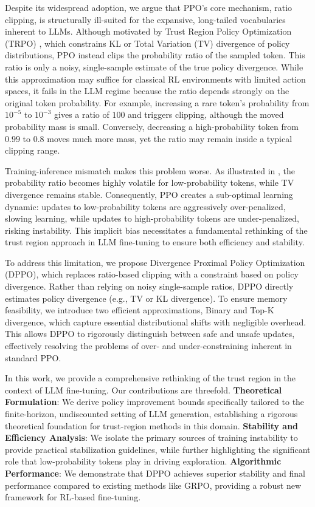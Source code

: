Despite its widespread adoption, we argue that PPO’s core mechanism, ratio clipping, is structurally ill-suited for the expansive, long-tailed vocabularies inherent to LLMs. Although motivated by Trust Region Policy Optimization (TRPO) \citep{schulman2015trust}, which constrains KL or Total Variation (TV) divergence of policy distributions, PPO instead clips the probability ratio of the sampled token. This ratio is only a noisy, single-sample estimate of the true policy divergence. While this approximation may suffice for classical RL environments with limited action spaces, it fails in the LLM regime because the ratio depends strongly on the original token probability. For example, increasing a rare token's probability from $10^{-5}$ to $10^{-3}$ gives a ratio of $100$ and triggers clipping, although the moved probability mass is small. Conversely, decreasing a high-probability token from $0.99$ to $0.8$ moves much more mass, yet the ratio may remain inside a typical clipping range.

Training-inference mismatch makes this problem worse. As illustrated in , the probability ratio becomes highly volatile for low-probability tokens, while TV divergence remains stable. Consequently, PPO creates a sub-optimal learning dynamic: updates to low-probability tokens are aggressively over-penalized, slowing learning, while updates to high-probability tokens are under-penalized, risking instability. This implicit bias necessitates a fundamental rethinking of the trust region approach in LLM fine-tuning to ensure both efficiency and stability.

To address this limitation, we propose Divergence Proximal Policy Optimization (DPPO), which replaces ratio-based clipping with a constraint based on policy divergence. Rather than relying on noisy single-sample ratios, DPPO directly estimates policy divergence (e.g., TV or KL divergence). To ensure memory feasibility, we introduce two efficient approximations, Binary and Top-K divergence, which capture essential distributional shifts with negligible overhead. This allows DPPO to rigorously distinguish between safe and unsafe updates, effectively resolving the problems of over- and under-constraining inherent in standard PPO.


In this work, we provide a comprehensive rethinking of the trust region in the context of LLM fine-tuning. Our contributions are threefold. \textbf{Theoretical Formulation}: We derive policy improvement bounds specifically tailored to the finite-horizon, undiscounted setting of LLM generation, establishing a rigorous theoretical foundation for trust-region methods in this domain. \textbf{Stability and Efficiency Analysis}: We isolate the primary sources of training instability to provide practical stabilization guidelines, while further highlighting the significant role that low-probability tokens play in driving exploration. \textbf{Algorithmic Performance}: We demonstrate that DPPO achieves superior stability and final performance compared to existing methods like GRPO, providing a robust new framework for RL-based fine-tuning.

